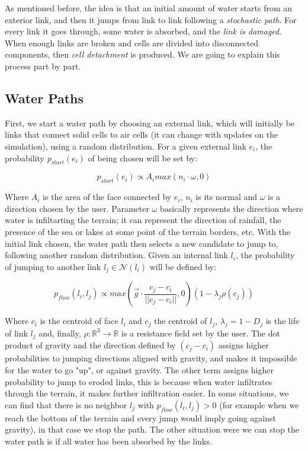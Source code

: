 \vspace{10pt}

As mentioned before, the idea is that an initial amount of water starts
from an exterior link, and then it jumps from link to link following 
a \textit{stochastic path}. For every link it goes through, some water 
is absorbed, and the \textit{link is damaged}. When enough links are broken
and cells are divided into disconnected components, then \textit{cell detachment}
is produced. We are going to explain this process part by part. 
\subsection{Water Paths}\label{sec:waterPaths}
First, we start a water path by choosing an external link, which will initially 
be links that connect solid cells to air cells (it can change with updates on the 
simulation), using a random distribution. For a given external link $e_i$, 
the probability $p_{start}(e_i)$ of being chosen will be set by:

\begin{equation}\label{eq:p_exterior}
    p_{start}(e_i) \propto A_i max(n_i \cdot \omega, 0)
\end{equation}

Where $A_i$ is the area of the face connected by $e_i$, $n_i$ is its normal 
and $\omega$ is a direction chosen by the user. Parameter $\omega$ basically 
represents the direction where water is infiltarting the terrain; it can 
represent the direction of rainfall, the presence of the sea or lakes
at some point of the terrain borders, etc. With the initial link chosen, 
the water path then selects a new candidate to jump to, following another 
random distribution. Given an internal link $l_i$, the probability of 
jumping to another link $l_j \in \mathcal{N}(l_i)$ will be defined by:

\begin{equation}\label{eq:p_flow}
    p_{flow}(l_i, l_j) \propto max(\vec{g} \cdot \frac{c_j - c_i}{||c_j - c_i||}, 0)(1 - \lambda_j\rho(c_j))
\end{equation}

Where $c_i$ is the centroid of face $l_i$ and $c_j$ the centroid of $l_j$, 
$\lambda_j = 1 - D_j$ is the life of link $l_j$ and, finally, $\rho: \mathbb{R}^3 \to \mathbb{R}$ is a resistance field 
set by the user. The dot product of gravity and the direction defined by 
$(c_j - c_i)$ assigns higher probabilities to jumping directions aligned 
with gravity, and makes it impossible for the water to go "up", or against 
gravity. The other term assigns higher probability to jump to eroded
links, this is because when water infiltrates through the terrain, it 
makes further infiltration easier. In some situations, we can find that 
there is no neighbor $l_j$ with $p_{flow}(l_i, l_j) > 0$ (for example when 
we reach the bottom of the terrain and every jump would imply going against 
gravity), in that case we stop the path. The other situation were we can 
stop the water path is if all water has been absorbed by the links. 

